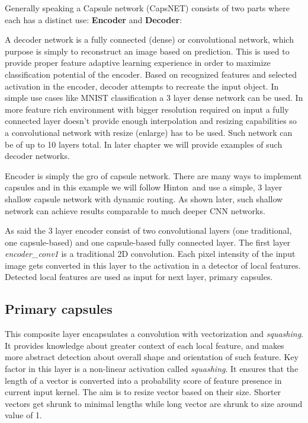 Generally speaking a Capsule network (CapsNET) consists of two parts where each has a distinct use: \textbf{Encoder} and \textbf{Decoder}:

A decoder network is a fully connected (dense) or convolutional network, which purpose is simply to reconstruct an image based on prediction. This is used to provide proper feature adaptive learning experience in order to maximize classification potential of the encoder. Based on recognized features and selected activation in the encoder, decoder attempts to recreate the input object. In simple use cases like MNIST classification a 3 layer dense network can be used. In more feature rich environment with bigger resolution required on input a fully connected layer doesn't provide enough interpolation and resizing capabilities so a convolutional network with resize (enlarge) has to be used. Such network can be of up to 10 layers total. In later chapter we will provide examples of such decoder networks.

Encoder is simply the gro of capsule network. There are many ways to implement capsules and in this example we will follow Hinton\,\cite{capsule} and use a simple, 3 layer shallow capsule network with dynamic routing. As shown later, such shallow network can achieve results comparable to much deeper CNN networks.

As said the 3 layer encoder consist of two convolutional layers (one traditional, one capsule-based) and one capsule-based fully connected layer. The first layer
\textit{encoder\_conv1} is a traditional 2D convolution. Each pixel intensity of the input image gets converted in this layer to the activation in a detector of local features. Detected local features are used as input for next layer, primary capsules.

\subsection{Primary capsules}

This composite layer encapsulates a convolution with vectorization and \textit{squashing}. It provides knowledge about greater context of each local feature, and makes more abstract detection about overall shape and orientation of such feature. Key factor in this layer is a non-linear activation called \textit{squashing}. It ensures that the length of a vector is converted into a probability score of feature presence in current input kernel. The aim is to resize vector based on their size. Shorter vectors get shrunk to minimal lengths while long vector are shrunk to size around value of 1.

